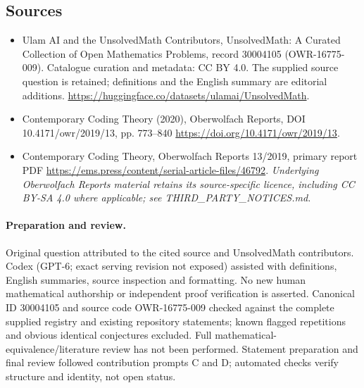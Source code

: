 \documentclass[11pt]{article}
\begin{document}
\subsection{Sources}
\begin{itemize}
\item[\hypertarget{source:30004105:1}{S1}] Ulam AI and the UnsolvedMath Contributors, UnsolvedMath: A Curated Collection of Open Mathematics Problems, record 30004105 (OWR-16775-009). Catalogue curation and metadata: CC BY 4.0. The supplied source question is retained; definitions and the English summary are editorial additions.
\url{https://huggingface.co/datasets/ulamai/UnsolvedMath}.
\item[\hypertarget{source:30004105:2}{S2}] Contemporary Coding Theory (2020), Oberwolfach Reports, DOI 10.4171/owr/2019/13, pp. 773--840
\url{https://doi.org/10.4171/owr/2019/13}.
\item[\hypertarget{source:30004105:3}{S3}] Contemporary Coding Theory, Oberwolfach Reports 13/2019, primary report PDF
\url{https://ems.press/content/serial-article-files/46792}.
\textit{Underlying Oberwolfach Reports material retains its source-specific licence, including CC BY-SA 4.0 where applicable; see THIRD\_PARTY\_NOTICES.md.}
\end{itemize}
\paragraph{Preparation and review.}
Original question attributed to the cited source and UnsolvedMath contributors. Codex (GPT-6; exact serving revision not exposed) assisted with definitions, English summaries, source inspection and formatting. No new human mathematical authorship or independent proof verification is asserted. Canonical ID 30004105 and source code OWR-16775-009 checked against the complete supplied registry and existing repository statements; known flagged repetitions and obvious identical conjectures excluded. Full mathematical-equivalence/literature review has not been performed. Statement preparation and final review followed contribution prompts C and D; automated checks verify structure and identity, not open status.
\label{end:30004105}
\end{document}
